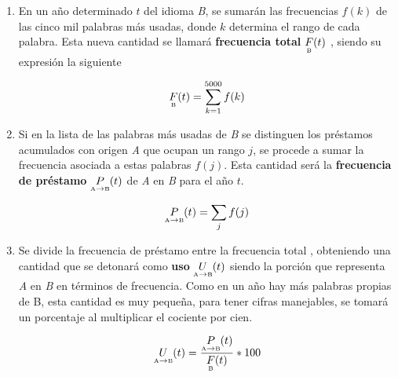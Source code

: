 \begin{enumerate}
	
	\item En un año determinado $t$ del idioma \textit{B}, se sumarán las
	frecuencias $f(k)$ de las cinco mil palabras más usadas, donde $k$ determina el rango  de cada palabra. Esta nueva cantidad se llamará \textbf{frecuencia total}  $\underset{\text{\tiny B}}{F}(t)$ , siendo su expresión la siguiente

	\begin{equation}
	\label{ec.ftot}
	\underset{\text{\tiny B}}{F}(t) = \sum_{k=1}^{5000} f(k)
	\end{equation}
	


	\item Si en la lista de las palabras más usadas de \textit{B} se distinguen los préstamos acumulados con origen \textit{A} que ocupan un rango $j$,  se procede a sumar la frecuencia asociada a estas palabras $f(j)$. Esta cantidad será la  \textbf{frecuencia de préstamo} $\underset{ \text{\tiny A} \to  \text{\tiny B} }{P}(t)$   de \textit{A} en \textit{B} para el año $t$.
	
	\begin{equation}
	\label{ec.fpres}
	\underset{ \text{\tiny A} \to  \text{\tiny B} }{P}(t) = \sum_{j} f(j)
	\end{equation}
	
	
	\item   Se divide la frecuencia de préstamo entre la frecuencia total , obteniendo una cantidad que se detonará como  \textbf{uso} $\underset{ \text{\tiny A} \to  \text{\tiny B} }{U}(t)$  siendo la porción que representa \textit{A} en \textit{B} en términos de frecuencia.  Como en un año hay más palabras propias de B, esta cantidad es muy pequeña, para tener cifras manejables, se tomará un porcentaje al multiplicar el cociente por cien.  

	\begin{equation}
	\label{ec.fuso}
	 \underset{ \text{\tiny A} \to  \text{\tiny B} }{U}(t) = \frac{	\underset{ \text{\tiny A} \to  \text{\tiny B} }{P}(t)}{\underset{\text{\tiny B}}{F}(t) } * 100
	\end{equation}
	

\end{enumerate}
